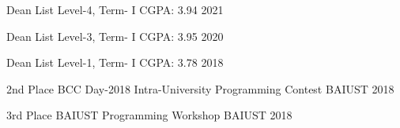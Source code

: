 



\begin{cvhonors}
  \cvhonor
    {Dean List} %
    {Level-4, Term- I} %
    {CGPA: 3.94} %
    {2021} %


  \cvhonor
    {Dean List} %
    {Level-3, Term- I} %
    {CGPA: 3.95} %
    {2020} %


  \cvhonor
    {Dean List} %
    {Level-1, Term- I} %
    {CGPA: 3.78} %
    {2018} %


\end{cvhonors}




\begin{cvhonors}

  \cvhonor
    {2nd Place} %
    {BCC Day-2018 Intra-University Programming Contest} %
    {BAIUST} %
    {2018} %

  \cvhonor
    {3rd Place} %
    {BAIUST Programming Workshop} %
    {BAIUST} %
    {2018} %
    
\end{cvhonors}
